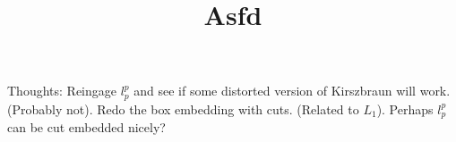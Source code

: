 \title{Asfd}

Thoughts:
Reingage $l_p^p$ and see if some distorted version of Kirszbraun will work.
(Probably not). 
Redo the box embedding with cuts. (Related to $L_1$). Perhaps $l_p^p$ can be cut embedded nicely?


